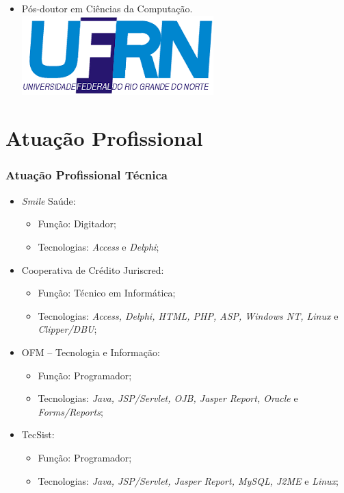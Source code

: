 \documentclass{beamer}
\begin{document}
\begin{frame}
\begin{itemize}
		\item Pós-doutor em Ciências da Computação.\\
		\includegraphics[scale=0.15]{imagens/ufrn-logo}
	\end{itemize}
\end{frame}

\section{Atuação Profissional}

\begin{frame}
	\frametitle{Atuação Profissional Técnica}

	\begin{itemize}
		\item \textit{Smile} Saúde:
		\begin{itemize}
			\item Função: Digitador;
			\item Tecnologias: \textit{Access} e \textit{Delphi};
		\end{itemize}
		
		\item Cooperativa de Crédito Juriscred:
		\begin{itemize}
			\item Função: Técnico em Informática;
			\item Tecnologias: \textit{Access, Delphi, HTML, PHP, ASP, Windows NT, Linux} e \textit{Clipper/DBU};
		\end{itemize}
		
		\item OFM -- Tecnologia e Informação:
		\begin{itemize}
			\item Função: Programador;
			\item Tecnologias: \textit{Java, JSP/Servlet, OJB, Jasper Report, Oracle} e \textit{Forms/Reports};
		\end{itemize}
		
		\item TecSist:
		\begin{itemize}
			\item Função: Programador;
			\item Tecnologias: \textit{Java, JSP/Servlet, Jasper Report, MySQL, J2ME} e \textit{Linux};
		\end{itemize}
	\end{itemize}
\end{frame}
\end{document}
